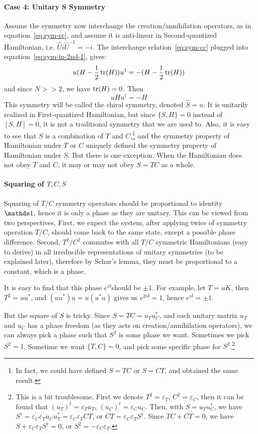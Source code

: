 \paragraph{Case 4: Unitary S Symmetry}
Assume the symmetry now interchange the creation/annihilation operators, as in
equation~\ref{eq:sym-cc}, and assume it is anti-linear in Second-quantized
Hamiltonian, i.e. $\hat{U}i\hat{U}^{-1}=-i$. The interchange
relation~\ref{eq:sym-cc} plugged into equation~\ref{eq:sym-in-2nd-1}, gives:
\begin{equation}
\label{eq:sym-S-cond}
u (H-\frac{1}{2}\tr(H)) u^\dagger = - (H-\frac{1}{2}\tr(H))
\end{equation}
and since $N>>2$, we have $\tr(H)=0$. Then
\begin{equation}
u H u^\dagger = -H
\end{equation}
This symmetry will be called the chiral symmetry, denoted $\hat{S}=u$. It is
unitarily realized in First-quantized Hamiltonian, but since $\{S,H\}=0$ instead
of $[S,H]=0$, it is not a traditional symmetry that we are used to. Also, it is
easy to see that $S$ is a combination of $T$ and $C$,\footnote{In fact, we could have
	defined $S=TC$ or $S=CT$, and obtained the same result.} and the symmetry
property of Hamiltonian under $T$ or $C$ uniquely defined the symmetry property
of Hamiltonian under $S$. But there is one exception. When the
Hamiltonian does not obey $T$ and $C$, it may or may not obey $S=TC$ as a
whole.

\paragraph{Squaring of $T,C,S$} 
Squaring of $T/C$ symmetry operators should be proportional to identity $\id$,
hence it is only a phase as they are unitary.
This can be viewed from two perspectives. First, we expect the system, after
applying twice of symmetry operation $T/C$, should come back to the same state, except
a possible phase difference. Second, $T^2/C^2$ commutes with all
$T/C$ symmetric Hamiltonians (easy to derive) in all irreducible representations
of unitary symmetries (to be explained later), therefore by Schur's lemma, they
must be proportional to a constant, which is a phase.

It is easy to find that this phase $e^{i\delta}$should be $\pm1$. For example, let $T=uK$,
then $T^2=uu^*$, and $(uu^*)u = u(u^*u)$ gives us $e^{2i\delta}=1$, hence
$e^{i\delta}=\pm1$.

But the square of $S$ is tricky. Since $S=TC=u_T u_C^*$, and each unitary matrix
$u_T$ and $u_C$ has a phase freedom (as they acts on creation/annihilation
operators), we can always pick a phase such that $S^2$ is some phase we want.
Sometimes we pick $S^2=1$. Sometime we want $\{T,C\}=0$, and pick some specific
phase for $S^2$.\footnote{This is a bit troublesome. First we denote
	$T^2=\varepsilon_T$, $C^2=\varepsilon_C$, then it can be found that
	$(u_T)^t=\varepsilon_T u_T$, $(u_C)^t = \varepsilon_C u_C$. Then, with
	$S=u_Tu_C^*$, we have $S^\dagger=\varepsilon_C\varepsilon_Tu_Cu_T^* =
	\varepsilon_C\varepsilon_T CT$, or $CT= \varepsilon_C\varepsilon_TS^\dagger$.
	Since $TC+CT=0$, we have $S+\varepsilon_C\varepsilon_T S^\dagger=0$, or
	$S^2=-\varepsilon_C\varepsilon_T$.}

